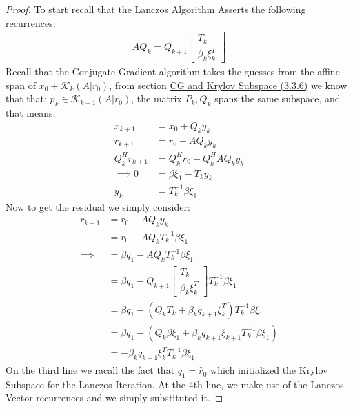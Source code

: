 \documentclass[]{article}
\theoremstyle{definition}
\begin{document}
            \begin{proof}
                To start recall that the Lanczos Algorithm Asserts the following recurrences:
                \begin{align}
                    AQ_k = Q_{k + 1} \begin{bmatrix}
                        T_k
                        \\
                        \beta_k \xi_k^T
                    \end{bmatrix}
                \end{align}
                Recall that the Conjugate Gradient algorithm takes the guesses from the affine span of $x_0 + \mathcal{K}_k(A|r_0)$, from section \hyperref[sec:CG_and_Krylov_Subspace]{CG and Krylov Subspace (3.3.6)} we know that that: $p_k \in \mathcal K_{k + 1}(A|r_0)$, the matrix $P_k, Q_k$ spans the same subspace, and that means: 
                \begin{align}
                    x_{k + 1} &= x_0 + Q_ky_k
                    \\
                    r_{k + 1} &= r_0 - AQ_k y_k
                    \\
                    Q^H_kr_{k + 1} &= Q_k^H r_0 - Q_k^HAQ_k y_k
                    \\
                    \implies
                    0 &= \beta\xi_1 - T_k y_k
                    \\
                    y_k &= T_k^{-1}\beta \xi_1
                \end{align}
                Now to get the residual we simply consider: 
                \begin{align}
                    r_{k + 1} &= r_0 - AQ_k y_k
                    \\
                    &= r_0 - AQ_k T_k^{-1}\beta \xi_1
                    \\
                    \implies
                    &= \beta q_1 - AQ_k T_k^{-1} \beta\xi_1
                    \\
                    &= \beta q_1 - Q_{k + 1}\begin{bmatrix}
                        T_k \\ \beta_k \xi_k^T
                    \end{bmatrix}T_k^{-1} \beta\xi_1
                    \\
                    &= \beta q_1 - 
                    (Q_k T_k + \beta_k q_{k + 1}\xi_k^T)T_k^{-1} \beta\xi_1
                    \\
                    &= 
                    \beta q_1 - (Q_k \beta \xi_1 + \beta_k q_{k + 1}\xi_{k + 1}T_k^{-1}\beta \xi_1)
                    \\
                    &= -\beta_k q_{k + 1}\xi_k^TT_k^{-1} \beta \xi_1
                \end{align}
                On the third line we racall the fact that $q_1 = \hat{r}_0$ which initialized the Krylov Subspace for the Lanczos Iteration. At the 4th line, we make use of the Lanczos Vector recurrences and we simply substituted it.


\end{proof}
\end{document}

